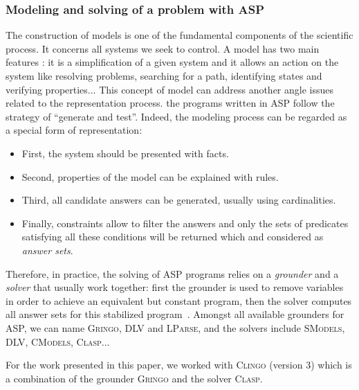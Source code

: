 \subsubsection{Modeling and solving of a problem with ASP}

The construction of models is one of the fundamental components of the scientific process.
It concerns all systems we seek to control.
A model has two main features \cite{Glimpse}:
it is a simplification of a given system
and it allows an action on the system like resolving problems, searching for a path, identifying states and verifying properties...
This concept of model can address another angle issues related to the representation process.
the programs written in ASP follow the strategy of “generate and test”.
Indeed, the modeling process can be regarded as a special form of representation:
\begin{itemize}
  \item First, the system should be presented with facts.
  \item Second, properties of the model can be explained with rules.
  \item Third, all candidate answers can be generated, usually using cardinalities.
  \item Finally, constraints allow to filter the answers and only the sets of predicates satisfying all these conditions will be returned which and considered as \emph{answer sets}.
\end{itemize}

Therefore, in practice, the solving of ASP programs relies on a \emph{grounder} and a \emph{solver}
that usually work together:
first the grounder is used to remove variables in order to achieve an equivalent but constant program,
then the solver computes all answer sets for this stabilized program~\cite{Vladimir,AnsPrologAPE}.
Amongst all available grounders for ASP, we can name
\textsc{Gringo}, \textsc{DLV} and \textsc{LParse},
and the solvers include
\textsc{SModels}, \textsc{DLV}, \textsc{CModels}, \textsc{Clasp}...

For the work presented in this paper, we worked with \textsc{Clingo} (version 3) which is a combination of the grounder \textsc{Gringo} and the solver \textsc{Clasp}.

